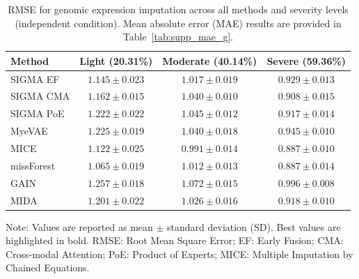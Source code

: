 \documentclass[final,3p,times,authoryear]{elsarticle}
\begin{document}
\begin{table}[!t]
\centering
{}
\caption{RMSE for genomic expression imputation across all methods and severity levels (independent condition). Mean absolute error (MAE) results are provided in Table~\ref{tab:supp_mae_g}.}
\label{tab:imputation_g}
\begin{tabular}{lccc}
\toprule
Method & Light (20.31\%) & Moderate (40.14\%) & Severe (59.36\%) \\
\midrule
SIGMA EF & $1.145 \pm 0.023$ & $1.017 \pm 0.019$ & $0.929 \pm 0.013$ \\
SIGMA CMA & $1.162 \pm 0.015$ & $1.040 \pm 0.010$ & $0.908 \pm 0.015$ \\
SIGMA PoE & $1.222 \pm 0.022$ & $1.045 \pm 0.012$ & $0.917 \pm 0.014$ \\
MyeVAE & $1.225 \pm 0.019$ & $1.040 \pm 0.018$ & $0.945 \pm 0.010$ \\
MICE & $1.122 \pm 0.025$ & $\mathbf{0.991 \pm 0.014}$ & $\mathbf{0.887 \pm 0.010}$ \\
missForest & $\mathbf{1.065 \pm 0.019}$ & $1.012 \pm 0.013$ & $\mathbf{0.887 \pm 0.014}$ \\
GAIN & $1.257 \pm 0.018$ & $1.072 \pm 0.015$ & $0.996 \pm 0.008$ \\
MIDA & $1.201 \pm 0.022$ & $1.026 \pm 0.016$ & $0.918 \pm 0.010$ \\
\bottomrule
\end{tabular}

\vspace{1ex}
\footnotesize{Note: Values are reported as mean $\pm$ standard deviation (SD). Best values are highlighted in bold. RMSE: Root Mean Square Error; EF: Early Fusion; CMA: Cross-modal Attention; PoE: Product of Experts; MICE: Multiple Imputation by Chained Equations.}
\end{table}
\end{document}
